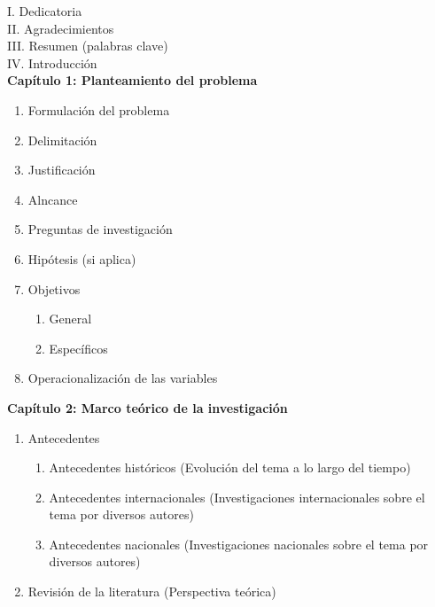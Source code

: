 \documentclass[12pt,a4paper]{article}
\begin{document}

\noindent I. Dedicatoria\\
II. Agradecimientos\\
III. Resumen (palabras clave)\\
IV. Introducción\\

\noindent\textbf{Capítulo 1: Planteamiento del problema}
\begin{enumerate}[resume] %
  \setcounter{enumi}{0}   %

  \item Formulación del problema
  \item Delimitación
  \item Justificación
  \item Alncance
  \item Preguntas de investigación
  \item Hipótesis (si aplica)
  \item Objetivos
  \begin{enumerate}
      \item General
      \item Específicos
  \end{enumerate}
  \item Operacionalización de las variables
\end{enumerate}

\noindent\textbf{Capítulo 2: Marco teórico de la investigación}
\begin{enumerate}[resume]
  \item Antecedentes
   \begin{enumerate}
      \item Antecedentes históricos (Evolución del tema a lo largo del tiempo)
      \item Antecedentes internacionales (Investigaciones internacionales sobre el tema por diversos autores)
      \item Antecedentes nacionales (Investigaciones nacionales sobre el tema por diversos autores)
  \end{enumerate}
   \item Revisión de la literatura (Perspectiva teórica)
\end{enumerate}
\end{document}
